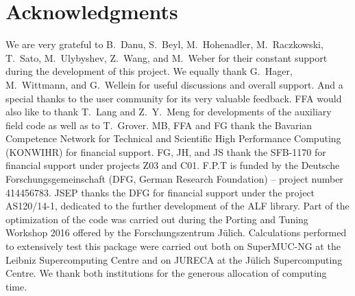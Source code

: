 

\section*{Acknowledgments} 

%

We are very grateful to  B.~Danu, S.~Beyl, M.~Hohenadler,  M.~Raczkowski, T.~Sato,  M.~Ulybyshev, Z.~Wang, and M.~Weber for their constant support during the development of this project.
We equally thank G.~Hager, M.~Wittmann, and G.~Wellein for useful discussions and overall support. And a special thanks to the user community for its very valuable feedback.
FFA would also like to thank T.~Lang  and Z.~Y.~Meng for developments of the auxiliary field code as well as to T.~Grover. 
MB, FFA  and FG thank the Bavarian Competence Network for Technical and Scientific High Performance Computing (KONWIHR) for financial support.
FG, JH, and JS thank the SFB-1170 for  financial support under projects Z03 and C01.
F.P.T is funded by the Deutsche Forschungsgemeinschaft (DFG, German Research Foundation) -- project number 414456783.
JSEP  thanks the DFG for financial support under the project AS120/14-1, dedicated to the further development of the ALF library.
Part of the optimization of the code was carried out during  the  Porting and Tuning Workshop 2016 offered by the Forschungszentrum J\"ulich.
Calculations performed to extensively test this package were carried out both on  SuperMUC-NG at the  Leibniz Supercomputing Centre and on  JURECA  \cite{Jureca16} at the J\"ulich Supercomputing Centre.  We thank both institutions for the generous allocation of computing time.
